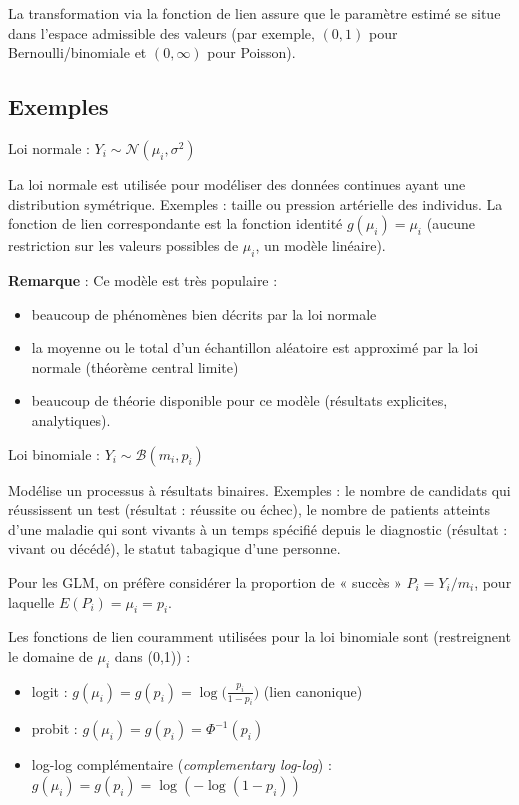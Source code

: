 \documentclass{BeamerTemplate}
\begin{document}
\begin{refsection}
\begin{frame}{}
La transformation via la fonction de lien assure que le
paramètre estimé se situe dans l'espace admissible des valeurs
(par exemple, $(0,1)$ pour Bernoulli/binomiale et $(0, \infty)$ pour Poisson).
\end{frame}

\subsection{Exemples}

\begin{frame}{Loi normale : $Y_i \sim {\mathcal N}(\mu_i,\sigma^2)$}


La loi normale est utilisée pour modéliser des données continues ayant une
distribution symétrique. Exemples : taille ou pression artérielle des individus. La
fonction de lien correspondante est la fonction identité $g(\mu_i)=\mu_i$ (aucune restriction sur les
valeurs possibles de $\mu_i$, un modèle linéaire).

\bigskip
\bigskip

\textbf{Remarque} : Ce modèle est très populaire :
\begin{itemize}
\item beaucoup de phénomènes bien décrits par la loi normale
\item la moyenne ou le total d'un échantillon aléatoire est approximé par la loi normale (théorème central limite)
\item beaucoup de théorie disponible pour ce modèle (résultats explicites, analytiques).
\end{itemize}
\end{frame}

\begin{frame}{Loi binomiale : $Y_i \sim {\mathcal B}(m_i,p_i)$}

Modélise un processus à résultats binaires. Exemples : le nombre de candidats qui
réussissent un test (résultat : réussite ou échec), le nombre de patients atteints d'une maladie
qui sont vivants à un temps spécifié depuis le diagnostic (résultat : vivant ou décédé), le
statut tabagique d'une personne.

\bigskip

Pour les GLM, on préfère considérer la proportion de « succès » $P_i = Y_i/m_i$, pour
laquelle $E(P_i) = \mu_i = p_i$.

\smallskip
Les fonctions de lien couramment utilisées pour la loi binomiale sont (restreignent le
domaine de $\mu_i$ dans (0,1)) :
\begin{itemize}
\item {\color{blue} logit} : $g(\mu_i) = g(p_i) =
\log\big(\frac{p_i}{1-p_i}\big)$ (lien canonique)
\item {\color{blue} probit} : $g(\mu_i) = g(p_i) = \Phi^{-1}(p_i)$
\item {\color{blue} log-log complémentaire} (\textit{complementary log-log}) : $g(\mu_i) = g(p_i) = \log(-\log(1-p_i))$
\end{itemize}
\end{frame}


\end{refsection}
\end{document}
